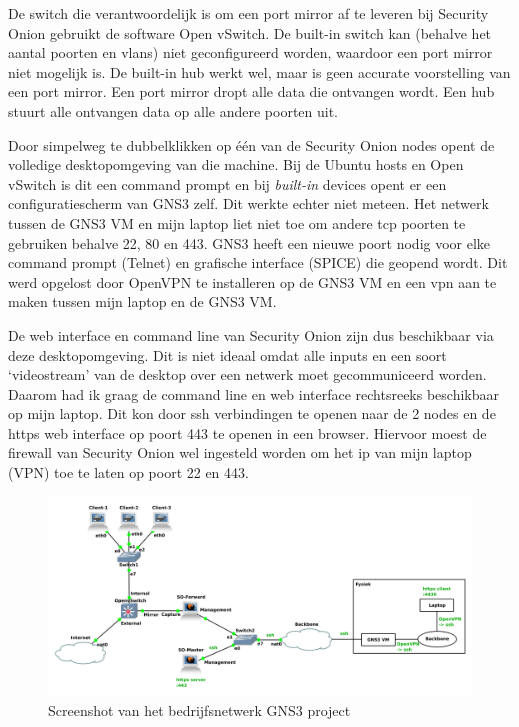 \documentclass[a4paper, 12pt]{report}
\begin{document}
De switch die verantwoordelijk is om een port mirror af te leveren bij Security Onion gebruikt de software Open vSwitch.
De built-in switch kan (behalve het aantal poorten en vlans) niet geconfigureerd worden, waardoor een port mirror niet mogelijk is.
De built-in hub werkt wel, maar is geen accurate voorstelling van een port mirror.
Een port mirror dropt alle data die ontvangen wordt.
Een hub stuurt alle ontvangen data op alle andere poorten uit.

Door simpelweg te dubbelklikken op één van de Security Onion nodes opent de volledige desktopomgeving van die machine.
Bij de Ubuntu hosts en Open vSwitch is dit een command prompt en bij \emph{built-in} devices opent er een configuratiescherm van GNS3 zelf.
Dit werkte echter niet meteen.
Het netwerk tussen de GNS3 VM en mijn laptop liet niet toe om andere tcp poorten te gebruiken behalve 22, 80 en 443.
GNS3 heeft een nieuwe poort nodig voor elke command prompt (Telnet) en grafische interface (SPICE) die geopend wordt.
Dit werd opgelost door OpenVPN te installeren op de GNS3 VM en een vpn aan te maken tussen mijn laptop en de GNS3 VM.

De web interface en command line van Security Onion zijn dus beschikbaar via deze desktopomgeving.
Dit is niet ideaal omdat alle inputs en een soort `videostream' van de desktop over een netwerk moet gecommuniceerd worden.
Daarom had ik graag de command line en web interface rechtsreeks beschikbaar op mijn laptop.
Dit kon door ssh verbindingen te openen naar de 2 nodes en de https web interface op poort 443 te openen in een browser.
Hiervoor moest de firewall van Security Onion wel ingesteld worden om het ip van mijn laptop (VPN) toe te laten op poort 22 en 443.

\begin{figure}[H]
  \centering
  \includegraphics[width=\textwidth]{gns3-simulatie-bedrijf}
  \caption{Screenshot van het bedrijfsnetwerk GNS3 project}
  \label{fig:gns3-simulatie-bedrijf}
\end{figure}
\end{document}
